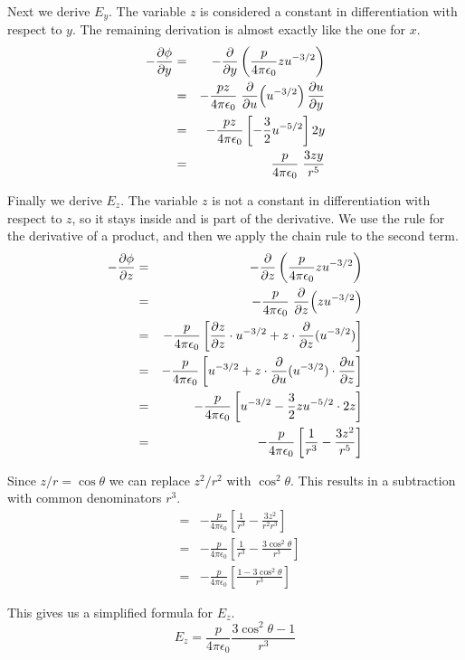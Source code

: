 Next we derive $E_y$.
The variable $z$ is considered a constant in differentiation with respect to $y$.
The remaining derivation is almost exactly like the one for $x$.
\begin{eqnarray*}
  -\frac{\partial \phi}{\partial y}
  &=& -\frac{\partial }{\partial y} \left( \frac{p}{4\pi\epsilon_0} z u^{-3/2} \right) \\
  &=& - \frac{pz}{4\pi\epsilon_0} \; \frac{\partial }{\partial u} \! \left( u^{-3/2} \right) \frac{\partial u}{\partial y} \\
  &=& - \frac{pz}{4\pi\epsilon_0} \left[-\frac{3}{2} u^{-5/2}\right] 2y \\
  &=& \frac{p}{4\pi\epsilon_0} \; \frac{3zy}{r^5}
\end{eqnarray*}

Finally we derive $E_z$.
The variable $z$ is not a constant in differentiation with respect to $z$, 
so it stays inside and is part of the derivative.
We use the rule for the derivative of a product, and then
we apply the chain rule to the second term.
\begin{eqnarray*}
  -\frac{\partial \phi}{\partial z}
  &=& -\frac{\partial }{\partial z} \left( \frac{p}{4\pi\epsilon_0} z u^{-3/2} \right) \\
  &=& -\frac{p}{4\pi\epsilon_0} \; \frac{\partial }{\partial z}\!\left(zu^{-3/2}\right) \\
  &=& -\frac{p}{4\pi\epsilon_0} \left[ \frac{\partial z}{\partial z} \cdot u^{-3/2}
      + z \cdot \frac{\partial }{\partial z}(u^{-3/2}) \right] \\
  &=& -\frac{p}{4\pi\epsilon_0} \left[ u^{-3/2}
      + z \cdot \frac{\partial }{\partial u}(u^{-3/2}) \cdot \frac{\partial u}{\partial z} \right] \\
  &=& -\frac{p}{4\pi\epsilon_0} \left[ u^{-3/2} - \frac{3}{2}zu^{-5/2} \cdot 2z \right] \\
  &=& -\frac{p}{4\pi\epsilon_0} \left[ \frac{1}{r^3} -\frac{3z^2}{r^5} \right]
\end{eqnarray*}

Since $z/r=\cos\theta$ we can replace $z^2/r^2$ with $\cos^2\theta$.
This results in a subtraction with common denominators $r^3$.
\begin{eqnarray*}
  &=& -\frac{p}{4\pi\epsilon_0} \left[ \frac{1}{r^3} -\frac{3z^2}{r^2r^3} \right] \\
  &=& -\frac{p}{4\pi\epsilon_0} \left[ \frac{1}{r^3} -\frac{3\cos^2\theta}{r^3} \right] \\
  &=& -\frac{p}{4\pi\epsilon_0} \left[ \frac{1 - 3\cos^2\theta}{r^3} \right]
\end{eqnarray*}

This gives us a simplified formula for $E_z$.
\begin{equation}
  E_z = \frac{p}{4\pi\epsilon_0} \frac{3\cos^2\theta-1}{r^3}
\end{equation}

